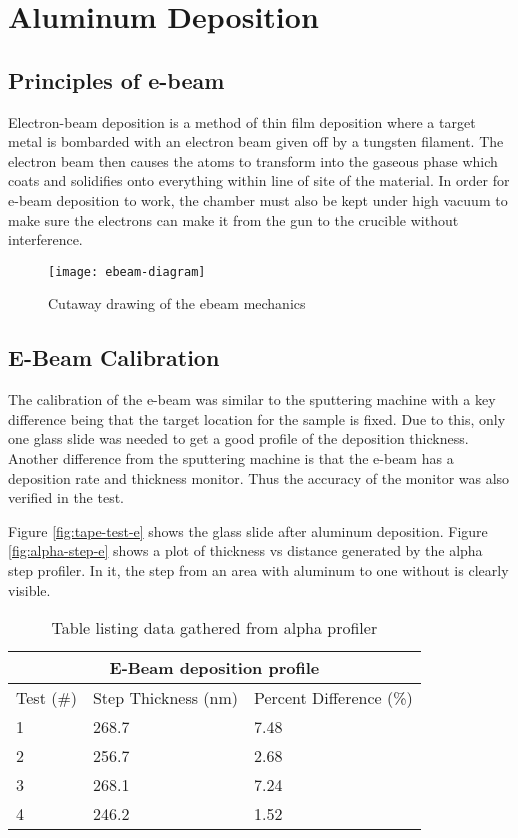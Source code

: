 
\section{Aluminum Deposition}
\subsection{Principles of e-beam}
Electron-beam deposition is a method of thin film deposition where a target metal is bombarded with an electron beam given off by a tungsten filament.
The electron beam then causes the atoms to transform into the gaseous phase which coats and solidifies onto everything within line of site of the material.
In order for e-beam deposition to work, the chamber must also be kept under high vacuum to make sure the electrons can make it from the gun to the crucible without interference.
\begin{figure}[htpb]
\centering
\texttt{[image: ebeam-diagram]}
\caption{Cutaway drawing of the ebeam mechanics}
\label{fig:ebeam-diagram}
\end{figure}

\subsection{E-Beam Calibration}
The calibration of the e-beam was similar to the sputtering machine with a key difference being that the target location for the sample is fixed.
Due to this, only one glass slide was needed to get a good profile of the deposition thickness.
Another difference from the sputtering machine is that the e-beam has a deposition rate and thickness monitor.
Thus the accuracy of the monitor was also verified in the test.

Figure \ref{fig:tape-test-e} shows the glass slide after aluminum deposition.
Figure \ref{fig:alpha-step-e} shows a plot of thickness vs distance generated by the alpha step profiler.
In it, the step from an area with aluminum to one without is clearly visible.

\begin{table}[htpb]
\centering
\begin{tabular}{ |p{4cm}|p{4cm}|p{4cm}|  }
 \hline
 \multicolumn{3}{|c|}{E-Beam deposition profile} \\
 \hline
 Test (\#)&Step Thickness (nm)&Percent Difference (\%)\\
 \hline
 1   & 268.7    &7.48\\
 2&   256.7  & 2.68\\
 3 &268.1 & 7.24\\
 4    &246.2 & 1.52\\
 \hline
\end{tabular}
\caption{Table listing data gathered from alpha profiler}
\label{table:test-e}
\end{table}

